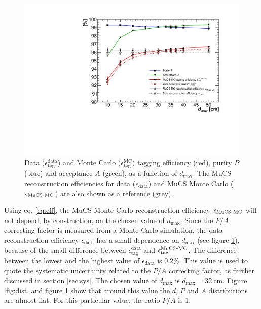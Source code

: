 \documentclass[a4paper,11pt]{article}
\def\myhyphen{{\hbox{-}}}
\begin{document}
\begin{figure}[htbp]
  \begin{center}
    \includegraphics[width=0.7\linewidth]{figures/purity.pdf}
    \caption{Data ($\epsilon^{\mathrm{data}}_{\mathrm{tag}}$) and Monte Carlo ($\epsilon^{\mathrm{MC}}_{\mathrm{tag}}$) tagging efficiency (red), purity $P$ (blue) and acceptance $A$ (green), as a function of $d_{\mathrm{max}}$. The MuCS reconstruction efficiencies for data ($\epsilon_{\mathrm{data}}$) and MuCS Monte Carlo ($\epsilon_{\mathrm{MuCS\myhyphen MC}}$) are also shown as a reference (grey).} \label{fig:purity}
  \end{center}
\end{figure}

Using eq. \eqref{eq:eff}, the MuCS Monte Carlo reconstruction efficiency $\epsilon_{\mathrm{MuCS\myhyphen MC}}$ will not depend, by construction, on the chosen value of $d_{\mathrm{max}}$. Since the $P/A$ correcting factor is measured from a Monte Carlo simulation, the data reconstruction efficiency $\epsilon_{\mathrm{data}}$ has a small dependence on $d_{\mathrm{max}}$ (see figure \ref{fig:purity}), because of the small difference between $\epsilon^{\mathrm{data}}_{\mathrm{tag}}$ and $\epsilon^{\mathrm{MuCS\myhyphen MC}}_{\mathrm{tag}}$.
The difference between the lowest and the highest value of $\epsilon_{\mathrm{data}}$ is 0.2\%. This value is used to quote the systematic uncertainty related to the $P/A$ correcting factor, as further discussed in section \ref{sec:sys}.
The chosen value of $d_{\mathrm{max}}$ is $d_{\mathrm{max}}=32~\mathrm{cm}$. Figure \ref{fig:dist} and figure \ref{fig:purity} show that around this value the $d$, $P$ and $A$ distributions are almost flat. For this particular value,  the ratio $P/A$ is 1.%

\end{document}
